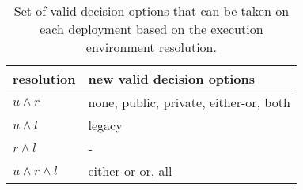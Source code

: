 \documentclass[../main.tex]{subfiles}
\begin{document}
    \begin{table}[h]
        \centering
        \begin{tabular}{ll}
            \toprule
            \textbf{resolution} & \textbf{new valid decision options} \\ \midrule
            $u\land r$  & none, public, private, either-or, both \\ \midrule
            $u\land l$ & legacy \\ \midrule
            $r\land l$ & - \\ \midrule
            $u\land r\land l$ & either-or-or, all \\
            \bottomrule
        \end{tabular}
        \captionsetup{justification=centering}
        \caption{
            Set of valid decision options that can be taken on each deployment based on the execution environment resolution.
        }
        \label{tab:policy_resolutions}
    \end{table}
\end{document}
